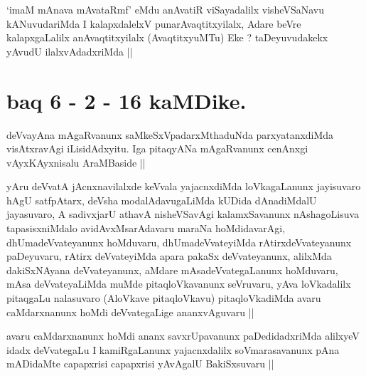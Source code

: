 \begin{artha}
`imaM mAnava mAvataRmf' eMdu anAvatiR viSayadalilx visheVSaNavu
  kANuvudariMda I kalapxdalelxV punarAvaqtitxyilalx, Adare beVre
  kalapxgaLalilx anAvaqtitxyilalx (AvaqtitxyuMTu) Eke ? taDeyuvudakekx
  yAvudU ilalxvAdadxriMda ||
\end{artha}

\section*{baq 6 - 2 - 16 kaMDike.}

\stext

\begin{artha}
deVvayAna mAgaRvanunx saMkeSxVpadarxMthaduNda parxyatanxdiMda
visAtxravAgi iLisidAdxyitu. Iga pitaqyANa mAgaRvanunx cenAnxgi
vAyxKAyxnisalu AraMBaside ||
\end{artha}

\begin{artha}
yAru deVvatA jAcnxnavilalxde keVvala yajacnxdiMda loVkagaLanunx
jayisuvaro hAgU satfpAtarx, deVsha modalAdavugaLiMda kUDida
dAnadiMdalU jayasuvaro, A sadivxjarU athavA nisheVSavAgi
kalamxSavanunx nAshagoLisuva tapasisxniMdalo avidAvxMsarAdavaru maraNa
hoMdidavarAgi, dhUmadeVvateyanunx hoMduvaru, dhUmadeVvateyiMda
rAtirxdeVvateyanunx paDeyuvaru, rAtirx deVvateyiMda apara pakaSx
deVvateyanunx, alilxMda dakiSxNAyana deVvateyanunx, aMdare
mAsadeVvategaLanunx hoMduvaru, mAsa deVvateyaLiMda muMde
pitaqloVkavanunx seVruvaru, yAva loVkadalilx pitaqgaLu nalasuvaro
(AloVkave pitaqloVkavu) pitaqloVkadiMda avaru caMdarxnanunx hoMdi
deVvategaLige ananxvAguvaru ||
\end{artha}


\begin{artha}
avaru caMdarxnanunx hoMdi ananx savxrUpavanunx paDedidadxriMda
alilxyeV idadx deVvategaLu I kamiRgaLanunx yajacnxdalilx
soVmarasavanunx pAna mADidaMte capapxrisi capapxrisi yAvAgalU
BakiSxsuvaru ||
\end{artha}


